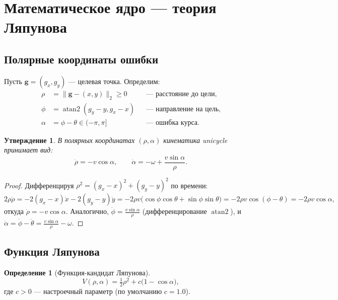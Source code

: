 \documentclass[12pt, a4paper]{article}
\newcommand{\atantwo}{\operatorname{atan2}}
\theoremstyle{definition}
\newtheorem{definition}{Определение}[section]
\theoremstyle{plain}
\newtheorem{proposition}{Утверждение}[section]
\begin{document}
\section{Математическое ядро --- теория Ляпунова}\label{sec:lyapunov}

\subsection{Полярные координаты ошибки}

Пусть $\mathbf{g} = (g_x, g_y)$ --- целевая точка.  Определим:
\begin{align}
  \rho   &= \|\mathbf{g} - (x,y)\|_2 \ge 0
           & &\text{--- расстояние до цели,} \label{eq:rho}\\
  \phi   &= \atantwo(g_y - y, g_x - x)
           & &\text{--- направление на цель,} \label{eq:phi}\\
  \alpha &= \phi - \theta \in (-\pi, \pi]
           & &\text{--- ошибка курса.} \label{eq:alpha}
\end{align}

\begin{proposition}
В полярных координатах $(\rho, \alpha)$ кинематика unicycle принимает вид:
\begin{equation}\label{eq:polar_dynamics}
  \dot{\rho} = -v\cos\alpha, \qquad
  \dot{\alpha} = -\omega + \frac{v\sin\alpha}{\rho}.
\end{equation}
\end{proposition}
\begin{proof}
Дифференцируя $\rho^2 = (g_x - x)^2 + (g_y - y)^2$ по времени:
\[
  2\rho\dot{\rho} = -2(g_x - x)\dot{x} - 2(g_y - y)\dot{y}
    = -2\rho v\bigl(\cos\phi\cos\theta + \sin\phi\sin\theta\bigr)
    = -2\rho v\cos(\phi - \theta)
    = -2\rho v\cos\alpha,
\]
откуда $\dot{\rho} = -v\cos\alpha$.  Аналогично,
$\dot{\phi} = \frac{v\sin\alpha}{\rho}$ (дифференцирование $\atantwo$), и
$\dot{\alpha} = \dot{\phi} - \dot{\theta} = \frac{v\sin\alpha}{\rho} - \omega$.
\end{proof}

\subsection{Функция Ляпунова}

\begin{definition}[Функция-кандидат Ляпунова]\label{def:V}
\begin{equation}\label{eq:lyapunov}
  \boxed{V(\rho, \alpha) = \tfrac{1}{2}\rho^2 + c\bigl(1 - \cos\alpha\bigr),}
\end{equation}
где $c > 0$ --- настроечный параметр (по умолчанию $c = 1.0$).
\end{definition}
\end{document}
